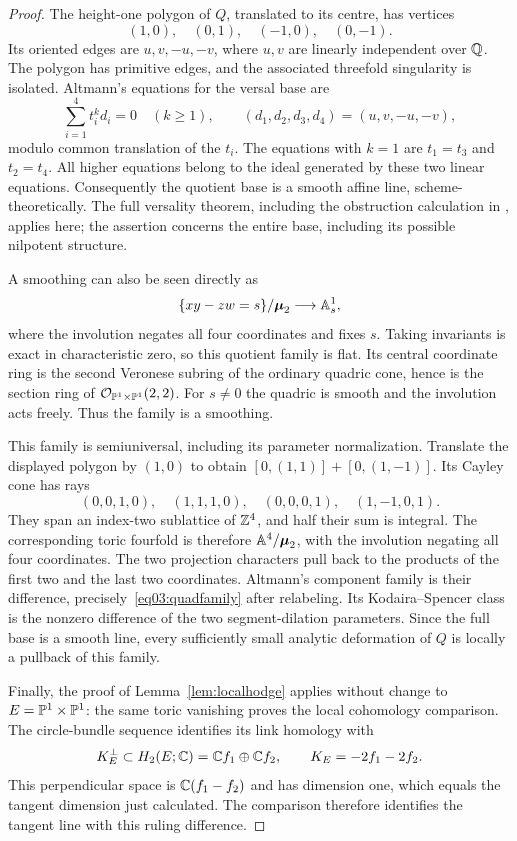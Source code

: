 \begin{proof}
The height-one polygon of $Q$, translated to its centre, has vertices
\[
 (1,0),\quad(0,1),\quad(-1,0),\quad(0,-1).
\]
Its oriented edges are $u,v,-u,-v$,
where $u,v$ are linearly independent over $\mathbb{Q}$.  The polygon has
primitive edges, and the associated threefold singularity is isolated.
Altmann's equations for the versal base are
\[
 \sum_{i=1}^4 t_i^k d_i=0\quad(k\geq1),
 \qquad(d_1,d_2,d_3,d_4)=(u,v,-u,-v),
\]
modulo common translation of the $t_i$.  The equations with $k=1$
are $t_1=t_3$ and $t_2=t_4$.  All higher equations belong to the ideal
generated by these two linear equations.  Consequently the quotient
base is a smooth affine line, scheme-theoretically.  The full versality
theorem, including the obstruction calculation in
\cite[Sections~6--7]{Altmann97}, applies here; the assertion concerns
the entire base, including its possible nilpotent structure.

A smoothing can also be seen directly as
\begin{equation}\label{eq03:quadfamily}
 \{xy-zw=s\}/\boldsymbol\mu_2\longrightarrow\mathbb{A}^1_s,
\end{equation}
where the involution negates all four coordinates and fixes $s$.
Taking invariants is exact in characteristic zero, so this quotient
family is flat.  Its central coordinate ring is the second Veronese
subring of the ordinary quadric cone, hence is the section ring of
$\mathcal{O}_{\mathbb{P}^1\times\mathbb{P}^1}(2,2)$.  For $s\ne0$ the quadric is smooth
and the involution acts freely.  Thus the family is a smoothing.

This family is semiuniversal, including its parameter normalization.
Translate the displayed polygon by $(1,0)$ to obtain
$[0,(1,1)]+[0,(1,-1)]$.  Its Cayley cone has rays
\[
 (0,0,1,0),\quad(1,1,1,0),\quad
 (0,0,0,1),\quad(1,-1,0,1).
\]
They span an index-two sublattice of $\mathbb{Z}^4$, and half their sum
is integral.  The corresponding toric fourfold is therefore
$\mathbb{A}^4/\boldsymbol\mu_2$, with the involution negating all four
coordinates.  The two projection characters pull back to the
products of the first two and the last two coordinates.
Altmann's component family \cite[\S8.1]{Altmann97} is their
difference, precisely~\eqref{eq03:quadfamily} after relabeling.
Its Kodaira--Spencer class is the nonzero difference of the two
segment-dilation parameters.  Since the full base is a smooth line,
every sufficiently small analytic deformation of $Q$ is locally a
pullback of this family.

Finally, the proof of Lemma~\ref{lem:localhodge} applies without change
to $E=\mathbb{P}^1\times\mathbb{P}^1$: the same toric vanishing proves the local
cohomology comparison.  The circle-bundle sequence identifies its link
homology with
\[
 K_E^\perp\subset H_2(E;\mathbb{C})
   =\mathbb{C} f_1\oplus\mathbb{C} f_2,
 \qquad K_E=-2f_1-2f_2.
\]
This perpendicular space is $\mathbb{C}(f_1-f_2)$ and has dimension one,
which equals the tangent dimension just calculated.  The comparison
therefore identifies the tangent line with this ruling difference.
\end{proof}

